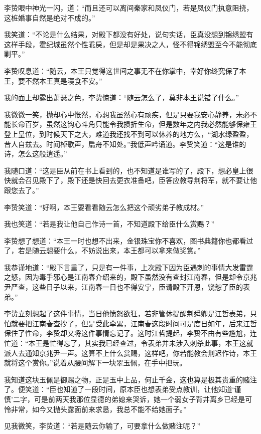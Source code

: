 李贽眼中神光一闪，道：“而且还可以离间秦家和凤仪门，若是凤仪门执意阻挠，这桩婚事自然是绝对不成的。”

我笑道：“不论是什么结果，对殿下都没有好处，说句实话，臣真没想到锦绣盟有这样手段，霍纪城虽然个性乖戾，但是却是果决之人，怪不得锦绣盟至今不能彻底剿平。”

李贽叹息道：“随云，本王只觉得这世间之事无不在你掌中，幸好你终究保了本王，要不然本王真是寝食不安。”

我的面上却露出萧瑟之色，李贽惊道：“随云怎么了，莫非本王说错了什么。”

我微微一笑，抛却心中怅然，心想我虽然心有顽疾，但是只要我安心静养，未必不能长命百岁，虽然这钩心斗角只能令我损折生命，但是数年之内我必然能够保雍王登上皇位，到时候天下之大，难道我还找不到可以休养的地方么，“湖水绿盈盈，昔人自兹去。时闻棹歌声，扁舟不知处。”我低声吟诵道。李贽笑道：“这是谁的诗，怎么这般逍遥。”

我随口道：“这是臣从前在书上看到的，也不知道是谁写的了，殿下，想必皇上很快就会召见殿下了，殿下还是快回去更衣准备吧，臣答应教导荆将军，就不要让他跟您去了。”

李贽笑道：“好啊，本王要看看随云怎么把这个顽劣弟子教成材。”

我也笑道：“若是我让他自己作诗一首，不知道殿下给臣什么赏赐？”

李贽想了想道：“本王一时也想不出来，金银珠宝你不喜欢，图书典籍你也都看过了，若是随云想要什么，不妨说出来，本王都可以拿来做奖赏。”

我恭谨地道：“殿下言重了，只是有一件事，上次殿下因为臣遇刺的事情大发雷霆之怒，因为毒手邪心是江南春介绍来的，殿下虽然没有查封江南春，但是却令京兆尹严查，这些日子以来，江南春一日也不得安宁，臣请殿下开恩，饶恕了臣的表弟。”

李贽立刻想起了这件事情，当日他愤怒欲狂，若非管休提醒荆舜卿是江哲表弟，只怕就要把江南春查抄了，但是受此牵累，江南春这段时间可是度日如年，后来江哲保住了性命，李贽却又将这件事情忘记了。这时江哲提起，李贽不由有些尴尬，连忙道：“本王是忙得忘了，其实我已经查过，令表弟并未涉入刺杀此事，本王这就派人去通知京兆尹一声。这算不上什么赏赐，这样吧，你若能教会荆迟作诗，本王就将这个赏你。”说着从腰间解下一块翠玉佩，在手中把玩。

我知道这块玉佩是御赐之物，正是玉中上品，何止千金，这也算是极其贵重的赌注了。便笑道：“臣也知道了一段时间，原本臣也想表弟受点教训，让他知道‘谨慎’二字，可是前两天我那位显德的弟媳来哭诉，她一个弱女子背井离乡已经是可怜非常，如今又抛头露面前来求恳，我总不能不给她面子。”

见我微笑，李贽道：“若是随云你输了，可要拿什么做赌注呢？”

